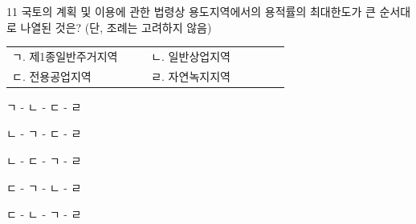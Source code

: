 \begin{question}{11}
국토의 계획 및 이용에 관한 법령상 용도지역에서의 용적률의 최대한도가 큰 순서대로 나열된 것은? (단, 조례는 고려하지 않음)
\begin{framedtext}
\noindent\begin{tabular}{@{}p{0.42\linewidth}p{0.42\linewidth}@{}}
ㄱ. 제1종일반주거지역 & ㄴ. 일반상업지역 \\
ㄷ. 전용공업지역 & ㄹ. 자연녹지지역 \\
\end{tabular}
\end{framedtext}
\begin{choices}
  \item ㄱ - ㄴ - ㄷ - ㄹ
  \item ㄴ - ㄱ - ㄷ - ㄹ
  \item ㄴ - ㄷ - ㄱ - ㄹ
  \item ㄷ - ㄱ - ㄴ - ㄹ
  \item ㄷ - ㄴ - ㄱ - ㄹ
\end{choices}
\end{question}
